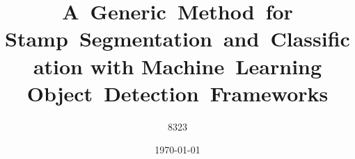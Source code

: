 \documentclass[12pt,oneside,a4paper]{hepthesis}
\title{A~Generic~Method~for Stamp~Segmentation~and~Classification with Machine~Learning Object~Detection~Frameworks}
\author{8323}
\date{\today}
\begin{document}



\begin{frontmatter}  %
  
\end{frontmatter}

\begin{mainmatter}

\end{mainmatter}

\begin{appendices} %

\end{appendices}

\begin{backmatter} %

\end{backmatter}
\end{document}
